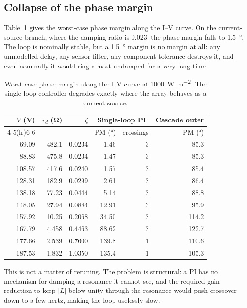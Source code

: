 \subsection{Collapse of the phase margin}

Table~\ref{tab:singleloop} gives the worst-case phase margin along the I--V
curve. On the current-source branch, where the damping ratio is \num{0.023}, the
phase margin falls to \SI{1.5}{\degree}. The loop is nominally stable, but a
\SI{1.5}{\degree} margin is no margin at all: any unmodelled delay, any sensor
filter, any component tolerance destroys it, and even nominally it would ring
almost undamped for a very long time.

\begin{table}[htbp]
\centering
\caption{Worst-case phase margin along the I--V curve at \SI{1000}{\watt\per\square\metre}. The single-loop controller degrades exactly where the array behaves as a current source.}
\label{tab:singleloop}
\begin{tabular}{@{}rrrrrr@{}}
\toprule
$V$ (\si{\volt}) & $r_d$ (\si{\ohm}) & $\zeta$ & \multicolumn{2}{c}{Single-loop PI} & Cascade outer \\
\cmidrule(lr){4-5}\cmidrule(lr){6-6}
 & & & PM (\si{\degree}) & crossings & PM (\si{\degree}) \\
\midrule
69.09  & 482.1 & 0.0234 & 1.46  & 3 & 85.3 \\
88.83  & 475.8 & 0.0234 & 1.47  & 3 & 85.3 \\
108.57 & 417.6 & 0.0240 & 1.57  & 3 & 85.4 \\
128.31 & 182.9 & 0.0299 & 2.61  & 3 & 86.4 \\
138.18 & 77.23 & 0.0444 & 5.14  & 3 & 88.8 \\
148.05 & 27.94 & 0.0884 & 12.91 & 3 & 95.9 \\
157.92 & 10.25 & 0.2068 & 34.50 & 3 & 114.2 \\
167.79 & 4.458 & 0.4463 & 88.62 & 3 & 122.7 \\
177.66 & 2.539 & 0.7600 & 139.8 & 1 & 110.6 \\
187.53 & 1.832 & 1.0350 & 135.4 & 1 & 105.3 \\
\bottomrule
\end{tabular}
\end{table}

This is not a matter of retuning. The problem is structural: a PI has no
mechanism for damping a resonance it cannot see, and the required gain reduction
to keep $|L|$ below unity through the resonance would push crossover down to a
few hertz, making the loop uselessly slow.

